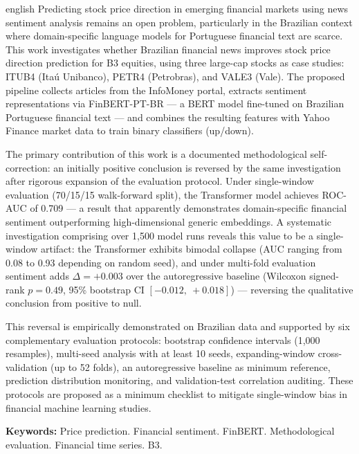 \begin{resumo}[Abstract]
\begin{otherlanguage*}{english}
Predicting stock price direction in emerging financial markets using news sentiment analysis remains an open problem, particularly in the Brazilian context where domain-specific language models for Portuguese financial text are scarce. This work investigates whether Brazilian financial news improves stock price direction prediction for B3 equities, using three large-cap stocks as case studies: ITUB4 (Itaú Unibanco), PETR4 (Petrobras), and VALE3 (Vale). The proposed pipeline collects articles from the InfoMoney portal, extracts sentiment representations via FinBERT-PT-BR --- a BERT model fine-tuned on Brazilian Portuguese financial text \cite{souza2023} --- and combines the resulting features with Yahoo Finance market data to train binary classifiers (up/down).

The primary contribution of this work is a documented methodological self-correction: an initially positive conclusion is reversed by the same investigation after rigorous expansion of the evaluation protocol. Under single-window evaluation (70/15/15 walk-forward split), the Transformer model \cite{vaswani2017} achieves ROC-AUC of 0.709 --- a result that apparently demonstrates domain-specific financial sentiment outperforming high-dimensional generic embeddings. A systematic investigation comprising over 1,500 model runs reveals this value to be a single-window artifact: the Transformer exhibits bimodal collapse (AUC ranging from 0.08 to 0.93 depending on random seed), and under multi-fold evaluation sentiment adds $\Delta = +0.003$ over the autoregressive baseline (Wilcoxon signed-rank $p = 0.49$, 95\% bootstrap CI $[-0.012,\ +0.018]$) --- reversing the qualitative conclusion from positive to null.

This reversal is empirically demonstrated on Brazilian data and supported by six complementary evaluation protocols: bootstrap confidence intervals (1,000 resamples), multi-seed analysis with at least 10 seeds, expanding-window cross-validation (up to 52 folds), an autoregressive baseline as minimum reference, prediction distribution monitoring, and validation-test correlation auditing. These protocols are proposed as a minimum checklist to mitigate single-window bias in financial machine learning studies.

\textbf{Keywords:} Price prediction. Financial sentiment. FinBERT. Methodological evaluation. Financial time series. B3.
\end{otherlanguage*}
\end{resumo}

